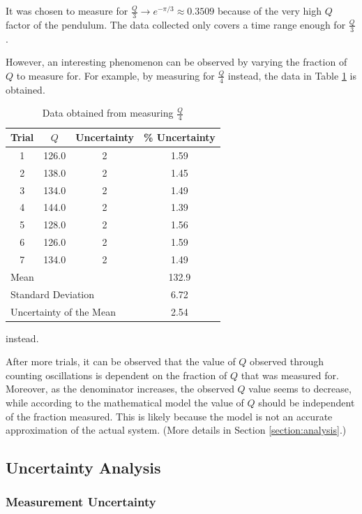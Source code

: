 \documentclass[aps,twocolumn,secnumarabic,nobalancelastpage,amsmath,amssymb,nofootinbib]{revtex4}
\begin{document}
It was chosen to measure for \(\frac{Q}{3} \rightarrow e^{-\pi/3} \approx 0.3509\) because of the very high \(Q\)
factor of the pendulum. The data collected only covers a time range enough for \(\frac{Q}{3}\).

However, an interesting phenomenon can be observed by varying the fraction of \(Q\) to measure for.
For example, by measuring for \(\frac{Q}{4}\) instead, the data in Table \ref{table:oscillation4} is obtained.
\begin{table}[h]
    \begin{tabular}{c|c|c|c}
        Trial & \(Q\) & Uncertainty & \% Uncertainty \\
        \hline
        1   & 126.0 & 2 & 1.59 \\
        2   & 138.0 & 2 & 1.45 \\
        3	& 134.0 & 2 & 1.49 \\
        4	& 144.0 & 2 & 1.39 \\
        5	& 128.0 & 2 & 1.56 \\
        6	& 126.0 & 2 & 1.59 \\
        7	& 134.0 & 2 & 1.49 \\
        \hline
        \multicolumn{3}{l}{Mean} & 132.9 \\
        \multicolumn{3}{l}{Standard Deviation} & 6.72 \\
        \multicolumn{3}{l}{Uncertainty of the Mean} & 2.54
    \end{tabular}
    \caption{Data obtained from measuring \(\frac{Q}{4}\)} instead.
    \label{table:oscillation4}
\end{table}

After more trials, it can be observed that the value of \(Q\) observed through counting oscillations is dependent on the
fraction of \(Q\) that was measured for. Moreover, as the denominator increases, the observed \(Q\) value seems to
decrease, while according to the mathematical model the value of \(Q\) should be independent of the fraction measured.
This is likely because the model is not an accurate approximation of the actual system. (More details in Section
\ref{section:analysis}.)

\subsection{Uncertainty Analysis}
\label{section:uncertainty}

\subsubsection{Measurement Uncertainty}
\end{document}
